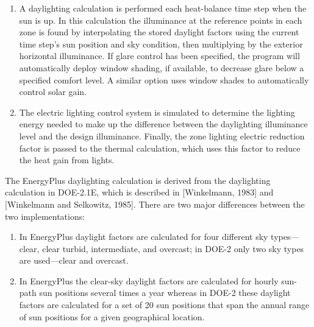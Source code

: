 \begin{enumerate}
\item
    A daylighting calculation is performed each heat-balance time step when the sun is up.
    In this calculation the illuminance at the reference points in each zone is found by interpolating the stored daylight factors using the current time step's sun position
    and sky condition, then multiplying by the exterior horizontal illuminance. If glare control has been specified, the program will automatically deploy window shading,
    if available, to decrease glare below a specified comfort level. A similar option uses window shades to automatically control solar gain.

\item
    The electric lighting control system is simulated to determine the lighting energy needed to make up the difference between the daylighting illuminance level and the design illuminance.
    Finally, the zone lighting electric reduction factor is passed to the thermal calculation, which uses this factor to reduce the heat gain from lights.
\end{enumerate}

The EnergyPlus daylighting calculation is derived from the daylighting calculation in DOE-2.1E, which is described in {[}Winkelmann, 1983{]} and {[}Winkelmann and Selkowitz, 1985{]}.
There are two major differences between the two implementations:

\begin{enumerate}
\def\labelenumi{(\arabic{enumi})}
\item
    In EnergyPlus daylight factors are calculated for four different sky types---clear, clear turbid, intermediate, and overcast; in DOE-2 only two sky types are used---clear and overcast.
\item
    In EnergyPlus the clear-sky daylight factors are calculated for hourly sun-path sun positions several times a year
    whereas in DOE-2 these daylight factors are calculated for a set of 20 sun positions that span the annual range of sun positions for a given geographical location.
\end{enumerate}
